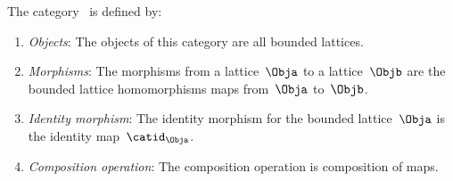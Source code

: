 \begin{ctdefinition}
    \label{def:BoundedLat}
    The category~\iindex{\BoundedLat} is defined by:
    \begin{enumerate}
        \item \emph{Objects}: The objects of this category are all bounded lattices.
        \item \emph{Morphisms}: The morphisms from a lattice~$\Obja$ to a lattice~$\Objb$ are the bounded lattice homomorphisms maps from~$\Obja$ to~$\Objb$.
        \item \emph{Identity morphism}: The identity morphism for the bounded lattice~$\Obja$
              is the identity map~$\catid_\Obja$.
        \item \emph{Composition operation}: The composition operation is composition of maps.
    \end{enumerate}
\end{ctdefinition}

